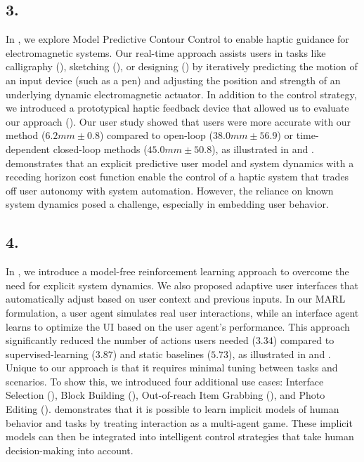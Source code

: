 \subsection*{3. \magpenTitle}
In , we explore Model Predictive Contour Control to enable haptic guidance for electromagnetic systems. Our real-time approach assists users in tasks like calligraphy (), sketching (), or designing () by iteratively predicting the motion of an input device (such as a pen) and adjusting the position and strength of an underlying dynamic electromagnetic actuator. In addition to the control strategy, we introduced a prototypical haptic feedback device that allowed us to evaluate our approach (). Our user study showed that users were more accurate with our method ($6.2mm \pm 0.8$) compared to open-loop ($38.0mm \pm 56.9$) or time-dependent closed-loop methods ($45.0mm \pm 50.8$), as illustrated in  and . \magpen demonstrates that an explicit predictive user model and system dynamics with a receding horizon cost function enable the control of a haptic system that trades off user autonomy with system automation. However, the reliance on known system dynamics posed a challenge, especially in embedding user behavior.

\subsection*{4. \marluiTitle}
In , we introduce a model-free reinforcement learning approach to overcome the need for explicit system dynamics. We also proposed adaptive user interfaces that automatically adjust based on user context and previous inputs. In our MARL formulation, a user agent simulates real user interactions, while an interface agent learns to optimize the UI based on the user agent's performance. This approach significantly reduced the number of actions users needed ($3.34$) compared to supervised-learning ($3.87$) and static baselines ($5.73$), as illustrated in  and . Unique to our approach is that it requires minimal tuning between tasks and scenarios. To show this, we introduced four additional use cases: Interface Selection (), Block Building (), Out-of-reach Item Grabbing (), and Photo Editing (). \marlui demonstrates that it is possible to learn implicit models of human behavior and tasks by treating interaction as a multi-agent game. These implicit models can then be integrated into intelligent control strategies that take human decision-making into account.

